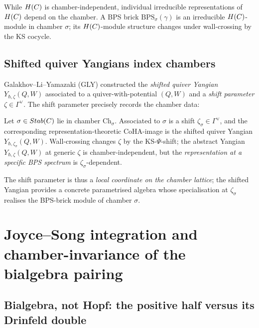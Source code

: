 \begin{corollary}
  \label{cor:reps-chamber-parametrised}
  While $H(C)$ is chamber-independent, individual irreducible
  representations of $H(C)$ depend on the chamber. A BPS brick
  $\mathrm{BPS}_\sigma(\gamma)$ is an irreducible $H(C)$-module in
  chamber $\sigma$; its $H(C)$-module structure changes under
  wall-crossing by the KS cocycle.
\end{corollary}

\subsection{Shifted quiver Yangians index chambers}

Galakhov--Li--Yamazaki (GLY) \cite{GalakhovLiYamazaki2021}
\cite{GalakhovLiYamazaki2022} constructed the \emph{shifted quiver Yangian}
$Y_{\hbar, \zeta}(Q, W)$ associated to a quiver-with-potential $(Q, W)$ and
a \emph{shift parameter} $\zeta \in \Gamma^\vee$. The shift parameter
precisely records the chamber data:

\begin{theorem}
  \label{thm:shifted-yangian-chambers}
  Let $\sigma \in Stab(C)$ lie in chamber $\mathrm{Ch}_\sigma$. Associated to
  $\sigma$ is a shift $\zeta_\sigma \in \Gamma^\vee$, and the corresponding
  representation-theoretic CoHA-image is the shifted quiver Yangian
  $Y_{\hbar, \zeta_\sigma}(Q, W)$. Wall-crossing changes $\zeta$ by the
  KS-$\Psi$-shift; the abstract Yangian
  $Y_{\hbar, \zeta}(Q, W)$ at generic $\zeta$ is chamber-independent, but
  the \emph{representation at a specific BPS spectrum} is
  $\zeta_\sigma$-dependent.
\end{theorem}

The shift parameter is thus a \emph{local coordinate on the chamber lattice};
the shifted Yangian provides a concrete parametrised algebra whose specialisation
at $\zeta_\sigma$ realises the BPS-brick module of chamber $\sigma$.

\section{Joyce--Song integration and chamber-invariance of the bialgebra pairing}
\label{sec:js-hopf-chamber-independence}

\subsection{Bialgebra, not Hopf: the positive half versus its Drinfeld double}
\label{subsec:bialgebra-not-hopf}

